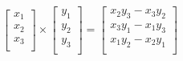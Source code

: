 \documentclass[a4paper,11pt]{article}
\theoremstyle{plain}
\theoremstyle{definition}
\begin{document}
\begin{align*}
	\begin{bmatrix}
		x_1 \\
		x_2 \\
		x_3 \\
	\end{bmatrix}
	{\times}
	\begin{bmatrix}
		y_1 \\
		y_2 \\
		y_3 \\
	\end{bmatrix}
	=
	\begin{bmatrix}
		x_2y_3-x_3y_2 \\
		x_3y_1-x_1y_3 \\
		x_1y_2-x_2y_1 \\
	\end{bmatrix} \\
\end{align*}
\end{document}
